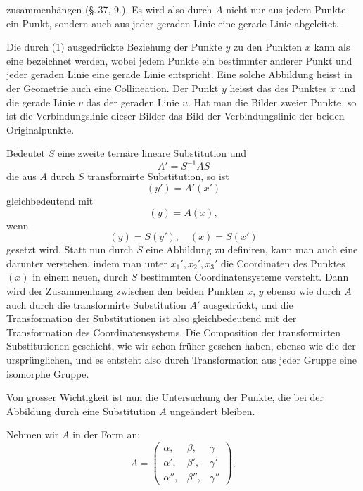zusammenhängen (\S.\,37, 9.). Es wird also durch $A$ nicht nur aus jedem Punkte ein Punkt, sondern auch aus jeder geraden Linie eine gerade Linie abgeleitet.

Die durch (1) ausgedrückte Beziehung der Punkte $y$ zu den Punkten $x$ kann als eine  bezeichnet werden, wobei jedem Punkte ein bestimmter anderer Punkt und jeder geraden Linie eine gerade Linie entspricht. Eine solche Abbildung heisst in der Geometrie auch eine Collineation. Der Punkt $y$ heisst das  des Punktes $x$ und die gerade Linie $v$ das  der geraden Linie $u$. Hat man die Bilder zweier Punkte, so ist die Verbindungslinie dieser Bilder das Bild der Verbindungslinie der beiden Originalpunkte.

Bedeutet $S$ eine zweite ternäre lineare Substitution und
\[ A' = S^{-1}AS \]
die aus $A$ durch $S$ transformirte Substitution, so ist
\[ (y') = A'(x') \]
gleichbedeutend mit
\[ (y) = A(x), \]
wenn
\[ (y) = S(y'), \quad (x) = S(x') \]
gesetzt wird. Statt nun durch $S$ eine Abbildung zu definiren, kann man auch eine  darunter verstehen, indem man unter $x_1', x_2', x_3'$ die Coordinaten des Punktes $(x)$ in einem neuen, durch $S$ bestimmten Coordinatensysteme versteht. Dann wird der Zusammenhang zwischen den beiden Punkten $x$, $y$ ebenso wie durch $A$ auch durch die transformirte Substitution $A'$ ausgedrückt, und die Transformation der Substitutionen ist also gleichbedeutend mit der Transformation des Coordinatensystems. Die Composition der transformirten Substitutionen geschieht, wie wir schon früher gesehen haben, ebenso wie die der ursprünglichen, und es entsteht also durch Transformation aus jeder Gruppe eine isomorphe Gruppe.

Von grosser Wichtigkeit ist nun die Untersuchung der Punkte, die bei der Abbildung durch eine Substitution $A$ ungeändert bleiben.

Nehmen wir $A$ in der Form an:
\[ A = \begin{pmatrix} \alpha, & \beta, & \gamma \\ \alpha', & \beta', & \gamma' \\ \alpha'', & \beta'', & \gamma'' \end{pmatrix}, \]
